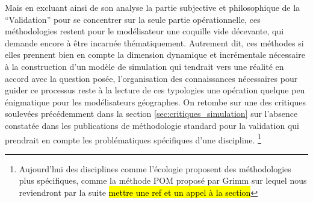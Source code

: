 
Mais en excluant ainsi de son analyse la partie subjective et philosophique de la \enquote{Validation} pour se concentrer sur la seule partie opérationnelle, ces méthodologies restent pour le modélisateur une coquille vide décevante, qui demande encore à être incarnée thématiquement. Autrement dit, ces méthodes si elles prennent bien en compte la dimension dynamique et incrémentale nécessaire à la construction d'un modèle de simulation qui tendrait vers une réalité en accord avec la question posée, l'organisation des connaissances nécessaires pour guider ce processus reste à la lecture de ces typologies une opération quelque peu énigmatique pour les modélisateurs géographes. On retombe sur une des critiques soulevées précédemment dans la section \ref{sec:critiques_simulation} sur l'absence constatée dans les publications de méthodologie standard pour la validation qui prendrait en compte les problématiques spécifiques d'une discipline. \footnote{Aujourd'hui des disciplines comme l'écologie proposent des méthodologies plus spécifiques, comme la méthode POM proposé par Grimm sur lequel nous reviendront par la suite \hl{mettre une ref et un appel à la section}}

